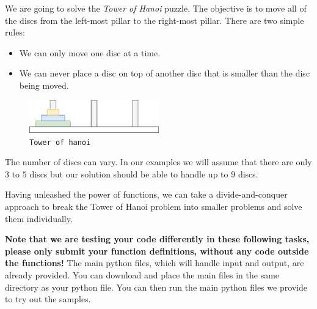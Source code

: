 
We are going to solve the \emph{Tower of Hanoi} puzzle.
The objective is to move all of the discs from the left-most pillar to the right-most pillar.
There are two simple rules:
\begin{itemize}
    \item We can only move one disc at a time.
    \item We can never place a disc on top of another disc that is smaller than the disc being moved.
\end{itemize}


\begin{figure}[h]
    \centering
    \includegraphics[width=0.5\textwidth]{tower}
    \caption{\texttt{Tower of hanoi}}
\end{figure}

The number of discs can vary.
In our examples we will assume that there are only $3$  to $5$ discs
but our solution should be able to handle up to $9$ discs.

Having unleashed the power of functions,
we can take a divide-and-conquer approach
to break the Tower of Hanoi problem into smaller problems and solve them individually.


\textbf{Note that we are testing your code differently in these following tasks,
please only submit your function definitions, without any code outside the functions!}
The main python files, which will handle input and output, are already provided.
You can download and place the main files in the same directory as your python file.
You can then run the main python files we provide to try out the samples.

